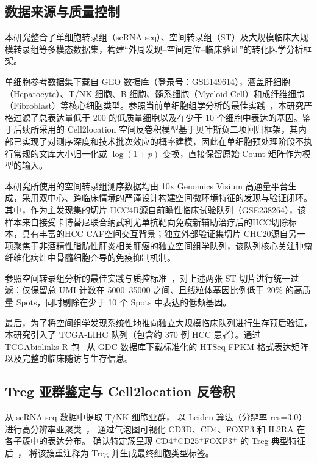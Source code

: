 \documentclass[12pt, a4paper]{ctexart}
\begin{document}
\subsection{数据来源与质量控制}

本研究整合了单细胞转录组（scRNA-seq）、空间转录组（ST）及大规模临床大规模转录组等多模态数据集，构建``外周发现--空间定位--临床验证”的转化医学分析框架。

单细胞参考数据集下载自 GEO 数据库（登录号：GSE149614），涵盖肝细胞（Hepatocyte）、T/NK 细胞、B 细胞、髓系细胞（Myeloid Cell）和成纤维细胞（Fibroblast）等核心细胞类型。参照当前单细胞组学分析的最佳实践~\citep{luecken2019current}，本研究严格过滤了总表达量低于 200 的低质量细胞以及在少于 10 个细胞中表达的基因。鉴于后续所采用的 Cell2location 空间反卷积模型基于贝叶斯负二项回归框架，其内部已实现了对测序深度和技术批次效应的概率建模，因此在单细胞预处理阶段不执行常规的文库大小归一化或 $\log(1+p)$ 变换，直接保留原始 Count 矩阵作为模型的输入。

本研究所使用的空间转录组测序数据均由 10x Genomics Visium 高通量平台生成，采用双中心、跨临床情境的严谨设计构建空间微环境特征的发现与验证闭环。其中，作为主发现集的切片 HCC4R源自前瞻性临床试验队列（GSE238264），该样本来自接受卡博替尼联合纳武利尤单抗靶向免疫新辅助治疗后的HCC切除标本，具有丰富的HCC-CAF空间交互背景；独立外部验证集切片 CHC20源自另一项聚焦于非酒精性脂肪性肝炎相关肝癌的独立空间组学队列，该队列核心关注肿瘤纤维化病灶中骨髓细胞介导的免疫抑制机制。

参照空间转录组分析的最佳实践与质控标准~\citep{williams2022introduction,palla2022squidpy}，对上述两张 ST 切片进行统一过滤：仅保留总 UMI 计数在 5000--35000 之间、且线粒体基因比例低于 20\% 的高质量 Spots，同时剔除在少于 10 个 Spots 中表达的低频基因。

最后，为了将空间组学发现系统性地推向独立大规模临床队列进行生存预后验证，本研究引入了 TCGA-LIHC 队列（包含约 370 例 HCC 患者）。通过 TCGAbiolinks R 包~\citep{colaprico2016tcgabiolinks} 从 GDC 数据库下载标准化的 HTSeq-FPKM 格式表达矩阵以及完整的临床随访与生存信息。

\subsection{Treg 亚群鉴定与 Cell2location 反卷积}

从 scRNA-seq 数据中提取 T/NK 细胞亚群，
以 Leiden 算法（分辨率 res=3.0）进行高分辨率亚聚类~\citep{traag2019leiden}，
通过气泡图可视化 CD3D、CD4、FOXP3 和 IL2RA 在各子簇中的表达分布。
确认特定簇呈现 CD4$^+$CD25$^+$FOXP3$^+$ 的 Treg 典型特征后~\citep{sakaguchi2020regulatory}，
将该簇重注释为 Treg 并生成最终细胞类型标签。
\end{document}
